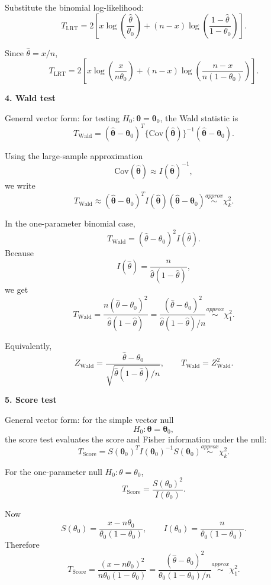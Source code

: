 \documentclass[12pt]{article}
\begin{document}
Substitute the binomial log-likelihood:
\[
T_{\mathrm{LRT}}
=2\left[
 x\log\left(\frac{\hat\theta}{\theta_0}\right)
 +(n-x)\log\left(\frac{1-\hat\theta}{1-\theta_0}\right)
\right].
\]

Since $\hat\theta=x/n$,
\[
T_{\mathrm{LRT}}
=2\left[
 x\log\left(\frac{x}{n\theta_0}\right)
 +(n-x)\log\left(\frac{n-x}{n(1-\theta_0)}\right)
\right].
\]

{\bf 4. Wald test}

General vector form: for testing $H_0:\boldsymbol\theta=\boldsymbol\theta_0$, the Wald statistic is
\[
T_{\mathrm{Wald}}
=(\hat{\boldsymbol\theta}-\boldsymbol\theta_0)^T
\{\mathrm{Cov}(\hat{\boldsymbol\theta})\}^{-1}
(\hat{\boldsymbol\theta}-\boldsymbol\theta_0).
\]

Using the large-sample approximation
\[
\mathrm{Cov}(\hat{\boldsymbol\theta})\approx I(\hat{\boldsymbol\theta})^{-1},
\]
we write
\[
T_{\mathrm{Wald}}
\approx
(\hat{\boldsymbol\theta}-\boldsymbol\theta_0)^T
I(\hat{\boldsymbol\theta})
(\hat{\boldsymbol\theta}-\boldsymbol\theta_0)
\overset{approx}{\sim}\chi^2_k.
\]

In the one-parameter binomial case,
\[
T_{\mathrm{Wald}}
=(\hat\theta-\theta_0)^2 I(\hat\theta).
\]
Because
\[
I(\hat\theta)=\frac{n}{\hat\theta(1-\hat\theta)},
\]
we get
\[
T_{\mathrm{Wald}}
=\frac{n(\hat\theta-\theta_0)^2}{\hat\theta(1-\hat\theta)}
=\frac{(\hat\theta-\theta_0)^2}{\hat\theta(1-\hat\theta)/n}
\overset{approx}{\sim}\chi^2_1.
\]

Equivalently,
\[
Z_{\mathrm{Wald}}
=\frac{\hat\theta-\theta_0}{\sqrt{\hat\theta(1-\hat\theta)/n}},
\qquad
T_{\mathrm{Wald}}=Z_{\mathrm{Wald}}^2.
\]
\smallskip

{\bf 5. Score test}

General vector form: for the simple vector null
\[
H_0: \boldsymbol\theta=\boldsymbol\theta_0,
\]
the score test evaluates the score and Fisher information under the null:
\[
T_{\mathrm{Score}}
=S(\boldsymbol\theta_0)^T
I(\boldsymbol\theta_0)^{-1}
S(\boldsymbol\theta_0)
\overset{approx}{\sim}\chi^2_k.
\]

For the one-parameter null $H_0:\theta=\theta_0$,
\[
T_{\mathrm{Score}}
=\frac{S(\theta_0)^2}{I(\theta_0)}.
\]

Now
\[
S(\theta_0)=\frac{x-n\theta_0}{\theta_0(1-\theta_0)},
\qquad
I(\theta_0)=\frac{n}{\theta_0(1-\theta_0)}.
\]
Therefore
\[
T_{\mathrm{Score}}
=\frac{(x-n\theta_0)^2}{n\theta_0(1-\theta_0)}
=\frac{(\hat\theta-\theta_0)^2}{\theta_0(1-\theta_0)/n}
\overset{approx}{\sim}\chi^2_1.
\]
\end{document}
